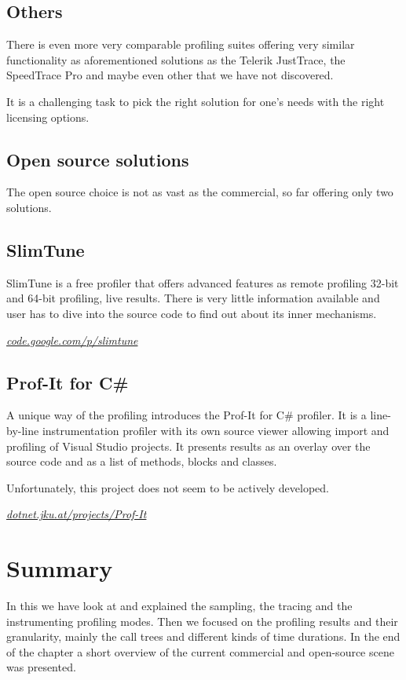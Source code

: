 \subsection{Others}
There is even more very comparable profiling suites offering very similar functionality as aforementioned solutions as the Telerik JustTrace, the SpeedTrace Pro and maybe even other that we have not discovered.

It is a challenging task to pick the right solution for one's needs with the right licensing options.

\subsection*{Open source solutions}
The open source choice is not as vast as the commercial, so far offering only two solutions.

\subsection{SlimTune}
SlimTune is a free profiler that offers advanced features as remote profiling 32-bit and 64-bit profiling, live results. There is very little information available and user has to dive into the source code to find out about its inner mechanisms.

\textit{\href{http://code.google.com/p/slimtune}{code.google.com/p/slimtune}}

\subsection{Prof-It for C\#}
A unique way of the profiling introduces the Prof-It for C\# profiler. It is a line-by-line instrumentation profiler with its own source viewer allowing import and profiling of Visual Studio projects. It presents results as an overlay over the source code and as a list of methods, blocks and classes. 

Unfortunately, this project does not seem to be actively developed. 

\textit{\href{http://dotnet.jku.at/projects/Prof-It/}{dotnet.jku.at/projects/Prof-It}}

\section*{Summary}
In this we have look at and explained the sampling, the tracing and the instrumenting profiling modes. Then we focused on the profiling results and their granularity, mainly the call trees and different kinds of time durations. In the end of the chapter a short overview of the current commercial and open-source scene was presented.

 

